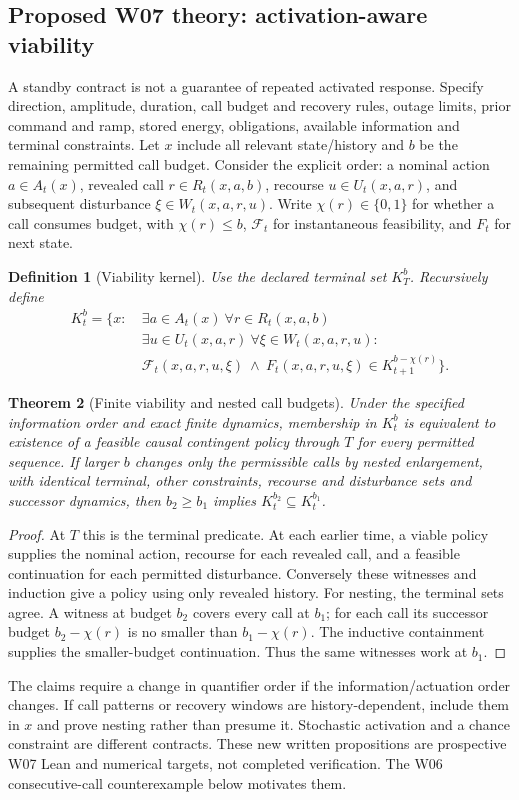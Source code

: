\documentclass[11pt,letterpaper]{article}
\newtheorem{coathm}{Theorem}[section]
\newtheorem{coadef}[coathm]{Definition}
\begin{document}
\subsection{Proposed W07 theory: activation-aware viability}
\label{sec:multicall}
A standby contract is not a guarantee of repeated activated response. Specify direction, amplitude, duration, call budget and recovery rules, outage limits, prior command and ramp, stored energy, obligations, available information and terminal constraints. Let $x$ include all relevant state/history and $b$ be the remaining permitted call budget. Consider the explicit order: a nominal action $a\in A_t(x)$, revealed call $r\in R_t(x,a,b)$, recourse $u\in U_t(x,a,r)$, and subsequent disturbance $\xi\in W_t(x,a,r,u)$. Write $\chi(r)\in\{0,1\}$ for whether a call consumes budget, with $\chi(r)\le b$, $\mathcal F_t$ for instantaneous feasibility, and $F_t$ for next state.
\begin{coadef}[Viability kernel]
Use the declared terminal set $K_T^b$. Recursively define
\begin{align*}
K_t^b=\{x:\ &\exists a\in A_t(x)\ \forall r\in R_t(x,a,b)\\
 &\exists u\in U_t(x,a,r)\ \forall \xi\in W_t(x,a,r,u):\\
 &\mathcal F_t(x,a,r,u,\xi)\ \wedge\
 F_t(x,a,r,u,\xi)\in K_{t+1}^{b-\chi(r)}\}.
\end{align*}
\end{coadef}
\begin{coathm}[Finite viability and nested call budgets]
\label{thm:coaviable}
Under the specified information order and exact finite dynamics, membership in $K_t^b$ is equivalent to existence of a feasible causal contingent policy through $T$ for every permitted sequence. If larger $b$ changes only the permissible calls by nested enlargement, with identical terminal, other constraints, recourse and disturbance sets and successor dynamics, then $b_2\ge b_1$ implies $K_t^{b_2}\subseteq K_t^{b_1}$.
\end{coathm}
\begin{proof}At $T$ this is the terminal predicate. At each earlier time, a viable policy supplies the nominal action, recourse for each revealed call, and a feasible continuation for each permitted disturbance. Conversely these witnesses and induction give a policy using only revealed history. For nesting, the terminal sets agree. A witness at budget $b_2$ covers every call at $b_1$; for each call its successor budget $b_2-\chi(r)$ is no smaller than $b_1-\chi(r)$. The inductive containment supplies the smaller-budget continuation. Thus the same witnesses work at $b_1$.\end{proof}
The claims require a change in quantifier order if the information/actuation order changes. If call patterns or recovery windows are history-dependent, include them in $x$ and prove nesting rather than presume it. Stochastic activation and a chance constraint are different contracts. These new written propositions are prospective W07 Lean and numerical targets, not completed verification. The W06 consecutive-call counterexample below motivates them.
\end{document}
